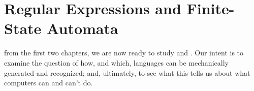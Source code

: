 
\newcommand{\ab}{\mbox{$\{a,b\}$}}
\newcommand{\aetc}[2]{\mbox{{${#1}_1{#1}_2\ldots {#1}_{#2}$}}}
\newcommand{\varep}{\varepsilon}
\newcommand{\fsafig}[1]{\medskip\centerline{\eps{fsa#1}}\medskip}

\newcommand{\REOR}{\hbox{$\,|\,$}}

\chapter[Regular Expressions and FSA's]{Regular Expressions and Finite-State Automata}

from the first two chapters, we
are now ready to study  and .
Our intent is to examine the question of how, and which, languages
can be mechanically generated and recognized; and, ultimately, to see
what this tells us about what computers can and can't do.

\bigskip

\newcommand{\dstar}{\delta^*}
\newcommand{\pstar}{\partial^*}
\newcommand{\winss}{w \in \Sigma^*}


